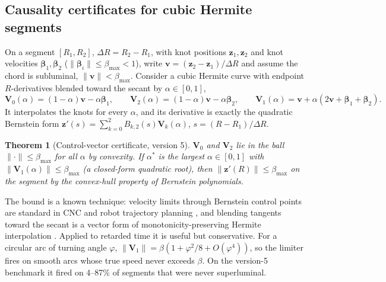 \documentclass[11pt, a4paper]{article}
\newtheorem{theorem}{Theorem}
\begin{document}
\subsection{Causality certificates for cubic Hermite segments}
On a segment $[R_1, R_2]$, $\Delta R = R_2 - R_1$, with knot positions $\mathbf{z}_1, \mathbf{z}_2$ and knot velocities $\boldsymbol{\beta}_1, \boldsymbol{\beta}_2$ ($\|\boldsymbol{\beta}_i\| \le \beta_{\max} < 1$), write $\mathbf{v} = (\mathbf{z}_2 - \mathbf{z}_1)/\Delta R$ and assume the chord is subluminal, $\|\mathbf{v}\| < \beta_{\max}$. Consider a cubic Hermite curve with endpoint $R$-derivatives blended toward the secant by $\alpha \in [0,1]$,
\begin{equation}
\mathbf{V}_0(\alpha) = (1-\alpha)\mathbf{v} - \alpha\boldsymbol{\beta}_1, \qquad \mathbf{V}_2(\alpha) = (1-\alpha)\mathbf{v} - \alpha\boldsymbol{\beta}_2, \qquad \mathbf{V}_1(\alpha) = \mathbf{v} + \alpha(2\mathbf{v} + \boldsymbol{\beta}_1 + \boldsymbol{\beta}_2).
\label{eq:ctrls}
\end{equation}
It interpolates the knots for every $\alpha$, and its derivative is exactly the quadratic Bernstein form $\mathbf{z}'(s) = \sum_{k=0}^{2} B_{k,2}(s)\mathbf{V}_k(\alpha)$, $s = (R - R_1)/\Delta R$.

\begin{theorem}[Control-vector certificate, version 5]\label{thm:ctrl}
$\mathbf{V}_0$ and $\mathbf{V}_2$ lie in the ball $\|\cdot\| \le \beta_{\max}$ for all $\alpha$ by convexity. If $\alpha^*$ is the largest $\alpha \in [0,1]$ with $\|\mathbf{V}_1(\alpha)\| \le \beta_{\max}$ (a closed-form quadratic root), then $\|\mathbf{z}'(R)\| \le \beta_{\max}$ on the segment by the convex-hull property of Bernstein polynomials.
\end{theorem}

The bound is a known technique: velocity limits through Bernstein control points are standard in CNC and robot trajectory planning \cite{farouki2008, tordesillas2020}, and blending tangents toward the secant is a vector form of monotonicity-preserving Hermite interpolation \cite{fritsch1980}. Applied to retarded time it is useful but conservative. For a circular arc of turning angle $\varphi$, $\|\mathbf{V}_1\| = \beta(1 + \varphi^2/8 + O(\varphi^4))$, so the limiter fires on smooth arcs whose true speed never exceeds $\beta$. On the version-5 benchmark it fired on 4--87\% of segments that were never superluminal.
\end{document}
